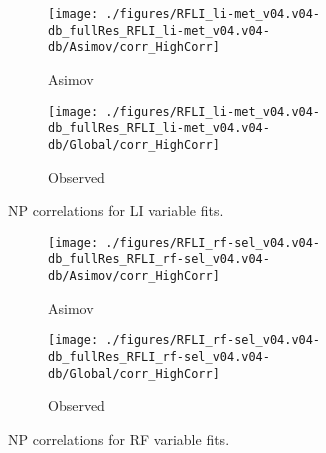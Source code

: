 \begin{figure}[!htbp]\captionsetup{justification=centering}
\begin{subfigure}[t]{0.49000\textwidth}\centering\texttt{[image: ./figures/RFLI\_li-met\_v04.v04-db\_fullRes\_RFLI\_li-met\_v04.v04-db/Asimov/corr\_HighCorr]}\caption{Asimov}\end{subfigure}
\begin{subfigure}[t]{0.49000\textwidth}\centering\texttt{[image: ./figures/RFLI\_li-met\_v04.v04-db\_fullRes\_RFLI\_li-met\_v04.v04-db/Global/corr\_HighCorr]}\caption{Observed}\end{subfigure}
  \caption{NP correlations for LI variable fits.}
  \label{fig:corrli-metvz}
\end{figure}


\begin{figure}[!htbp]\captionsetup{justification=centering}
\begin{subfigure}[t]{0.49000\textwidth}\centering\texttt{[image: ./figures/RFLI\_rf-sel\_v04.v04-db\_fullRes\_RFLI\_rf-sel\_v04.v04-db/Asimov/corr\_HighCorr]}\caption{Asimov}\end{subfigure}
\begin{subfigure}[t]{0.49000\textwidth}\centering\texttt{[image: ./figures/RFLI\_rf-sel\_v04.v04-db\_fullRes\_RFLI\_rf-sel\_v04.v04-db/Global/corr\_HighCorr]}\caption{Observed}\end{subfigure}
  \caption{NP correlations for RF variable fits.}
  \label{fig:corrrf-selvz}
\end{figure}

\clearpage
